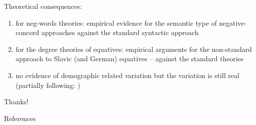 \documentclass[
  ignorenonframetext,
]{beamer}
\newif\ifbibliography
\begin{document}
\begin{frame}
Theoretical consequences:

\begin{enumerate}
\item
  for neg-words theories: empirical evidence for the semantic type of
  negative-concord approaches \cite{ovalle2004double,kuhn2022dynamics}
  against the standard syntactic approach \cite{zeijlstra2004sentential}
\item
  for the degree theories of equatives: empirical arguments for the
  non-standard approach to Slavic (and German) equatives --
  \cite{penka2016degree} against the standard theories
  \cite{stechow1984comparing,beck201913}
\item
  no evidence of demographic related variation but the variation is
  still real (partially following:
  \citealt{burnett2015variable,burnett2018structural})
\end{enumerate}
\end{frame}

\begin{frame}
\begin{center}
\Huge Thanks!
\end{center}

\normalsize
\end{frame}

\begin{frame}
\end{frame}

\renewcommand\refname{References}
\begin{frame}[allowframebreaks]{References}
  \bibliographytrue
  
\end{frame}
\end{document}
